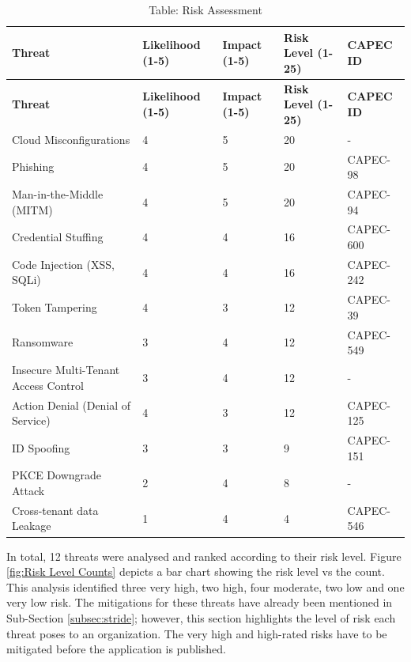\begin{longtable}{|p{4cm}|p{2cm}|p{2cm}|p{2cm}|p{3cm}|}
\caption{Table: Risk Assessment}
\label{table:risk_assessment}
\hline
\rowcolor{grey!15}
\textbf{Threat} & \textbf{Likelihood (1-5)} & \textbf{Impact (1-5)} & \textbf{Risk Level (1-25)} & \textbf{CAPEC ID}\\
\hline
\endfirsthead

\hline
\rowcolor{grey!15}
\textbf{Threat} & \textbf{Likelihood (1-5)} & \textbf{Impact (1-5)} & \textbf{Risk Level (1-25)} & \textbf{CAPEC ID}\\
\hline
\endhead

\hline
\endfoot

\hline
\endlastfoot
Cloud Misconfigurations & 4 & 5 & \cellcolor{red!90} 20 & - \\
\hline
Phishing & 4 & 5 & \cellcolor{red!90} 20 & CAPEC-98  \\
\hline
Man-in-the-Middle (MITM) & 4 & 5 & \cellcolor{red!90} 20 &  CAPEC-94\\
\hline
Credential Stuffing & 4 & 4 & \cellcolor{red!60} 16 & CAPEC-600 \\
\hline
Code Injection (XSS, SQLi) & 4 & 4 & \cellcolor{red!60} 16 & CAPEC-242 \\
\hline
Token Tampering & 4 & 3 &  \cellcolor{yellow!90} 12 &CAPEC-39 \\
\hline
Ransomware & 3 & 4 &  \cellcolor{yellow!90} 12 & CAPEC-549 \\
\hline
Insecure Multi-Tenant Access Control & 3 & 4 &  \cellcolor{yellow!90} 12 & - \\
\hline
Action Denial (Denial of Service) & 4 & 3 &  \cellcolor{yellow!90} 12 & CAPEC-125\\
\hline
ID Spoofing & 3 & 3 &  \cellcolor{green!20} 9 & CAPEC-151\\
\hline

PKCE Downgrade Attack & 2 & 4 & \cellcolor{green!20} 8 & -\\
\hline
Cross-tenant data Leakage & 1 & 4 &  \cellcolor{green!80} 4 & CAPEC-546 \\
\hline

\end{longtable}
 In total, 12 threats were analysed and ranked according to their risk level. Figure \ref{fig:Risk Level Counts} depicts a bar chart showing the risk level vs the count. This analysis identified three very high, two high, four moderate, two low and one very low risk. The mitigations for these threats have already been mentioned in Sub-Section \ref{subsec:stride}; however, this section highlights the level of risk each threat poses to an organization. The very high and high-rated risks have to be mitigated before the application is published. 

